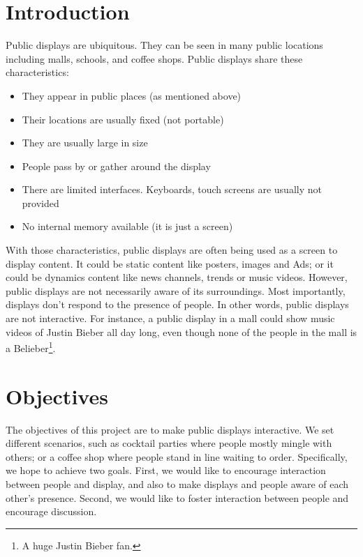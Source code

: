 \documentclass{sig-alternate}
\begin{document}

\maketitle
{}

\section{Introduction}
Public displays are ubiquitous. They can be seen in many public locations including malls, schools, and coffee shops. Public displays share these characteristics:
\begin{itemize}
	\item They appear in public places (as mentioned above)
	\item Their locations are usually fixed (not portable)
	\item They are usually large in size
	\item People pass by or gather around the display
	\item There are limited interfaces. Keyboards, touch screens are usually not provided
	\item No internal memory available (it is just a screen)
\end{itemize}

With those characteristics, public displays are often being used as a screen to display content. It could be static content like posters, images and Ads; or it could be dynamics content like news channels, trends or music videos. However, public displays are not necessarily aware of its surroundings. Most importantly, displays don't respond to the presence of people. In other words, public displays are not interactive. For instance, a public display in a mall could show music videos of Justin Bieber all day long, even though none of the people in the mall is a Belieber\footnote{A huge Justin Bieber fan.}.

\section{Objectives}
The objectives of this project are to make public displays interactive. We set different 
scenarios, such as cocktail parties where people mostly mingle with others; or a coffee 
shop where people stand in line waiting to order. Specifically, we hope to achieve two 
goals. First, we would like to encourage interaction between people and display, and 
also to make displays and people aware of each other's presence. Second, we would 
like to foster interaction between people and encourage discussion.
\end{document}
